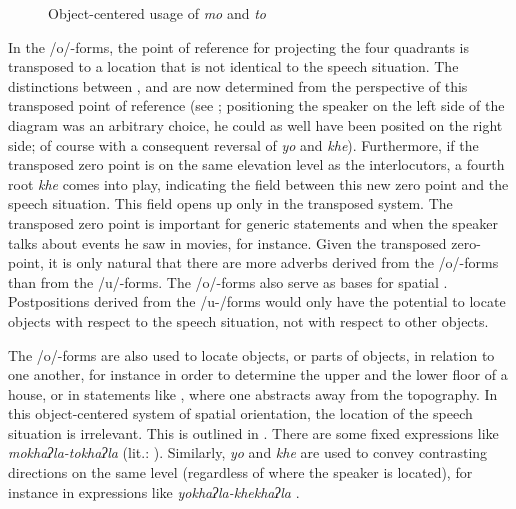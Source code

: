 \bigskip

\begin{figure}
\centering
\setlength{\fboxsep}{0pt}
\caption{Object-centered usage of \emph{mo} and \emph{to}}\label{deicticschema-3}
\end{figure}


In the /o/-forms, the point of reference for  projecting the four quadrants is transposed to a location that is not identical to the speech situation. The distinctions between ,  and  are now determined from the perspective of this transposed point of reference (see ; positioning  the speaker on the left side of the diagram was an arbitrary choice, he could as well have been posited on the right side; of course with a consequent reversal of \emph{yo} and \emph{khe}). Furthermore, if the transposed zero point is on the same elevation level as the interlocutors, a fourth root \emph{khe} comes into play, indicating the field between this new zero point and the speech situation. This field opens up only in the transposed system. The transposed zero point is important for generic statements and when the speaker talks about events he saw in movies, for instance. Given the transposed zero-point, it is only natural that there are more adverbs derived from the /o/-forms than from the /u/-forms. The  /o/-forms also serve as bases for spatial . Postpositions derived from the /u-/forms would only have the potential to locate objects with respect to the speech situation, not with respect to other objects.

The /o/-forms are also used to locate objects, or parts of objects, in relation to one another, for instance in order to determine the upper and the lower floor of a house, or in statements like , where one abstracts away from the topography. In this object-centered system of spatial orientation, the location of the speech situation is irrelevant.  This is outlined in .  There are some fixed expressions like \emph{mokhaʔla-tokhaʔla}  (lit.: ). Similarly, \emph{yo} and \emph{khe} are used to convey contrasting directions on the same level (regardless of where the speaker is located), for instance in expressions like \emph{yokhaʔla-khekhaʔla} .

